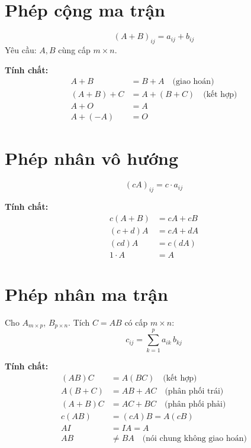 \section{Phép cộng ma trận}

\[
(A + B)_{ij} = a_{ij} + b_{ij}
\]
Yêu cầu: $A, B$ cùng cấp $m \times n$.

\textbf{Tính chất:}
\begin{align}
A + B &= B + A \quad \text{(giao hoán)} \\
(A + B) + C &= A + (B + C) \quad \text{(kết hợp)} \\
A + O &= A \\
A + (-A) &= O
\end{align}

\section{Phép nhân vô hướng}

\[
(cA)_{ij} = c \cdot a_{ij}
\]

\textbf{Tính chất:}
\begin{align}
c(A + B) &= cA + cB \\
(c + d)A &= cA + dA \\
(cd)A &= c(dA) \\
1 \cdot A &= A
\end{align}

\section{Phép nhân ma trận}

Cho $A_{m \times p}$, $B_{p \times n}$. Tích $C = AB$ có cấp $m \times n$:
\[
c_{ij} = \sum_{k=1}^{p} a_{ik} \, b_{kj}
\]

\textbf{Tính chất:}
\begin{align}
(AB)C &= A(BC) \quad \text{(kết hợp)} \\
A(B + C) &= AB + AC \quad \text{(phân phối trái)} \\
(A + B)C &= AC + BC \quad \text{(phân phối phải)} \\
c(AB) &= (cA)B = A(cB) \\
AI &= IA = A \\
AB &\neq BA \quad \text{(nói chung không giao hoán)}
\end{align}

